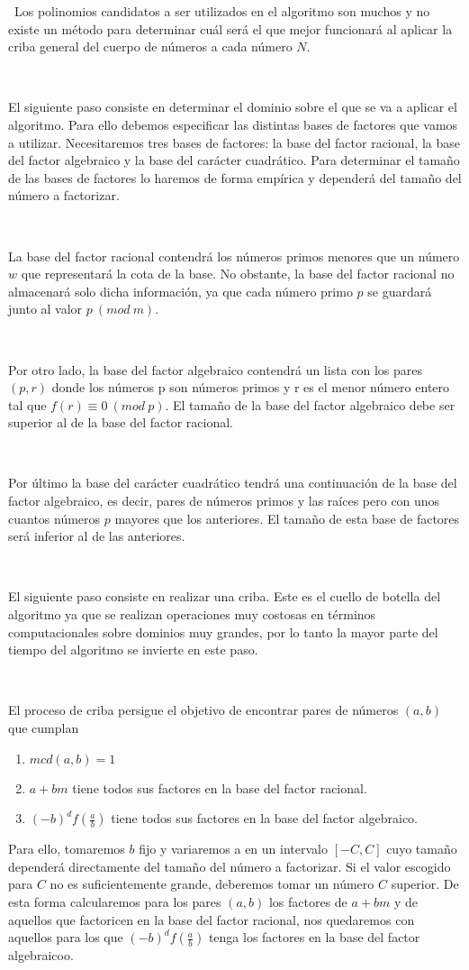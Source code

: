 \documentclass[11pt, conference]{IEEEtran}
\begin{document}
\
Los polinomios candidatos a ser utilizados en el algoritmo son muchos y no existe un método para determinar cuál será el que mejor funcionará al aplicar la criba general del cuerpo de números a cada número $N$.

\

El siguiente paso consiste en determinar el dominio sobre el que se va a aplicar el algoritmo. Para ello debemos especificar las distintas bases de factores que vamos a utilizar. Necesitaremos tres bases de factores: la base del factor racional, la base del factor algebraico y la base del carácter cuadrático. Para determinar el tamaño de las bases de factores lo haremos de forma empírica y dependerá del tamaño del número a factorizar. 

\

La base del factor racional contendrá los números primos menores que un número $w$ que representará la cota de la base. No obstante, la base del factor racional no almacenará solo dicha información, ya que cada número primo $p$ se guardará junto al valor $p\ (mod\ m)$.

\

Por otro lado, la base del factor algebraico contendrá un lista con los pares $(p, r)$ donde los números p son números primos y r es el menor número entero tal que $f(r) \equiv 0\ (mod\ p)$. El tamaño de la base del factor algebraico debe ser superior al de la base del factor racional.

\

Por último la base del carácter cuadrático tendrá una continuación de la base del factor algebraico, es decir, pares de números primos y las raíces pero con unos cuantos números $p$ mayores que los anteriores. El tamaño de esta base de factores será inferior al de las anteriores.

\

El siguiente paso consiste en realizar una criba. Este es el cuello de botella del algoritmo ya que se realizan operaciones muy costosas en términos computacionales sobre dominios muy grandes, por lo tanto la mayor parte del tiempo del algoritmo se invierte en este paso.

\

El proceso de criba persigue el objetivo de encontrar pares de números $(a, b)$ que cumplan

\begin{enumerate}
	\item $mcd(a,b) = 1$
	\item $a+bm$ tiene todos sus factores en la base del factor racional.
	\item $(-b)^df(\frac{a}{b})$ tiene todos sus factores en la base del factor algebraico.
\end{enumerate}
Para ello, tomaremos $b$ fijo y variaremos a en un intervalo $[-C, C]$ cuyo tamaño dependerá directamente del tamaño del número a factorizar. Si el valor escogido para $C$ no es suficientemente grande, deberemos tomar un número $C$ superior. De esta forma calcularemos para los pares $(a, b)$ los factores de $a+bm$ y de aquellos que factoricen en la base del factor racional, nos quedaremos con aquellos para los que $(-b)^d f (\frac{a}{b})$ tenga los factores en la base del factor algebraicoo.
\end{document}

